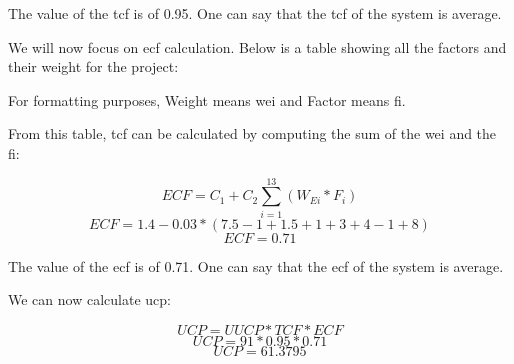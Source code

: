 \documentclass[11pt]{article}
\begin{document}
The value of the \gls{tcf} is of 0.95. One can say that the \gls{tcf} of the system is average.

\newpage

We will now focus on \gls{ecf} calculation. Below is a table showing all the factors and their weight for the project:

\begin{table}[ht!]
\centering
\caption{\gls{ecf} calculation}
\end{table}

For formatting purposes, Weight means \gls{wei} and Factor means \gls{fi}. \newline

From this table, \gls{tcf} can be calculated by computing the sum of the \gls{wei} and the \gls{fi}:

$$ ECF = C_{1} + C_{2}\sum\limits_{i=1}^{13} (W_{Ei} * F_{i}) $$
$$ ECF = 1.4 - 0.03 * (7.5 - 1 + 1.5 + 1 + 3 + 4 - 1 + 8) $$
$$ ECF = 0.71 $$

The value of the \gls{ecf} is of 0.71. One can say that the \gls{ecf} of the system is average.

We can now calculate \gls{ucp}:

$$ UCP = UUCP * TCF * ECF $$
$$ UCP = 91 * 0.95 * 0.71 $$
$$ UCP = 61.3795 $$
\end{document}

